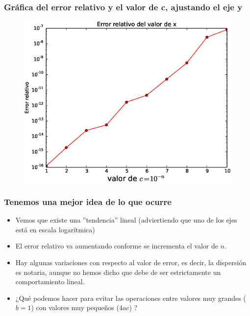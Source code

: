 \begin{frame}[fragile]
\frametitle{Gráfica del error relativo y el valor de c, ajustando el eje y}
\begin{figure}
	\centering
	\includegraphics[scale=0.45]{Imagenes/Ejercicio_Eq_Cuadratica_02.eps} 
\end{figure}
\end{frame}
\begin{frame}
\frametitle{Tenemos una mejor idea de lo que ocurre}
\begin{itemize}
\item Vemos que existe una ''tendencia'' lineal (adviertiendo que uno de los ejes está en escala logarítmica)
\item El error relativo va aumentando conforme se incrementa el valor de $n$.
\item Hay algunas variaciones con respecto al valor de error, es decir, la dispersión es notaria, aunque no hemos dicho que debe de ser estrictamente un comportamiento lineal.
\item ¿Qué podemos hacer para evitar las operaciones entre valores muy grandes ($b=1$) con valores muy pequeños ($4ac$) ?
\end{itemize}
\end{frame}
